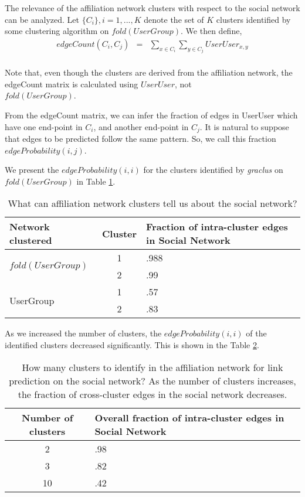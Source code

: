 \documentclass{report}
\begin{document}
The relevance of the affiliation network clusters with respect to the social network can be analyzed. Let $\{C_i\}, i = 1, ..., K$ denote the set of $K$ clusters identified by some clustering algorithm on $fold(UserGroup)$. We then define,
\begin{eqnarray*}
	edgeCount(C_i, C_j) &=& \sum_{x \in C_i}\sum_{y \in C_j} UserUser_{x,y}\\
\end{eqnarray*}

Note that, even though the clusters are derived from the affiliation network, the edgeCount matrix is calculated using $UserUser$, not\\ $fold(UserGroup)$.

From the edgeCount matrix, we can infer the fraction of edges in UserUser which have one end-point in $C_i$, and another end-point in $C_j$. It is natural to suppose that edges to be predicted follow the same pattern. So, we call this fraction $edgeProbability(i, j)$.

We present the $edgeProbability(i, i)$ for the clusters identified by \textit{graclus} \cite{dhillonGraclus} on $fold(UserGroup)$ in Table \ref{tab:predictivePower}.

\begin{table}
\centering
\begin{tabular}{| l | c | p{5cm} |}
\hline
 Network clustered & Cluster & Fraction of intra-cluster edges in Social Network\\
\hline
\multirow{2}{*}{$fold(UserGroup)$} & 1 & .988\\
	& 2 & .99\\ 
\hline
\multirow{2}{*}{UserGroup} & 1 & .57\\
	& 2 & .83\\
\hline
\end{tabular}
\caption{What can affiliation network clusters tell us about the social network?}
\label{tab:predictivePower}
\end{table} 

As we increased the number of clusters, the $edgeProbability(i, i)$ of the identified clusters decreased significantly. This is shown in the Table \ref{tab:clusterNumber}.

\begin{table}
\centering
\begin{tabular}{| c | p{5cm} |}
\hline
Number of clusters & Overall fraction of intra-cluster edges in Social Network\\
\hline
2 & .98\\
3 & .82\\
10 & .42\\
\hline
\end{tabular}
\caption{How many clusters to identify in the affiliation network for link prediction on the social network? As the number of clusters increases, the fraction of cross-cluster edges in the social network decreases.}
\label{tab:clusterNumber}
\end{table}
\end{document}
